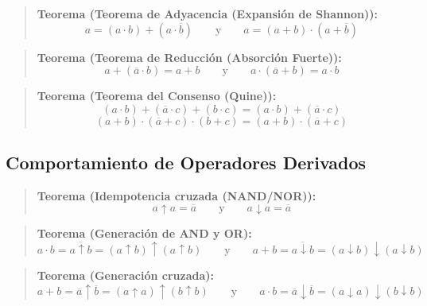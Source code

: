 \setcounter{tcb@cnt@teorema}{13}
\begin{quote}\textbf{Teorema (Teorema de Adyacencia (Expansión de Shannon)):}\label{adyacencia_eng}
\[ a = (a \cdot b) + (a \cdot \overline{b}) \qquad \text{y} \qquad a = (a + b) \cdot (a + \overline{b}) \]
\end{quote}

\setcounter{tcb@cnt@teorema}{14}
\begin{quote}\textbf{Teorema (Teorema de Reducción (Absorción Fuerte)):}\label{reduccion_eng}
\[ a + (\overline{a} \cdot b) = a + b \qquad \text{y} \qquad a \cdot (\overline{a} + b) = a \cdot b \]
\end{quote}

\setcounter{tcb@cnt@teorema}{15}
\begin{quote}\textbf{Teorema (Teorema del Consenso (Quine)):}\label{consenso_eng}
\[ (a \cdot b) + (\overline{a} \cdot c) + (b \cdot c) = (a \cdot b) + (\overline{a} \cdot c) \]
\[ (a + b) \cdot (\overline{a} + c) \cdot (b + c) = (a + b) \cdot (\overline{a} + c) \]
\end{quote}

\subsection*{Comportamiento de Operadores Derivados}

\setcounter{tcb@cnt@teorema}{13}
\begin{quote}\textbf{Teorema (Idempotencia cruzada (NAND/NOR)):}\label{idemp_cruzada_eng}
\[ a \uparrow a = \overline{a} \qquad \text{y} \qquad a \downarrow a = \overline{a} \]
\end{quote}

\setcounter{tcb@cnt@teorema}{14}
\begin{quote}\textbf{Teorema (Generación de AND y OR):}\label{gen_inf_sup_eng}
\[ a \cdot b = \overline{a \uparrow b} = (a \uparrow b) \uparrow (a \uparrow b) \qquad \text{y} \qquad a + b = \overline{a \downarrow b} = (a \downarrow b) \downarrow (a \downarrow b) \]
\end{quote}

\setcounter{tcb@cnt@teorema}{15}
\begin{quote}\textbf{Teorema (Generación cruzada):}\label{gen_cruzada_eng}
\[ a + b = \overline{a} \uparrow \overline{b} = (a \uparrow a) \uparrow (b \uparrow b) \qquad \text{y} \qquad a \cdot b = \overline{a} \downarrow \overline{b} = (a \downarrow a) \downarrow (b \downarrow b) \]
\end{quote}


